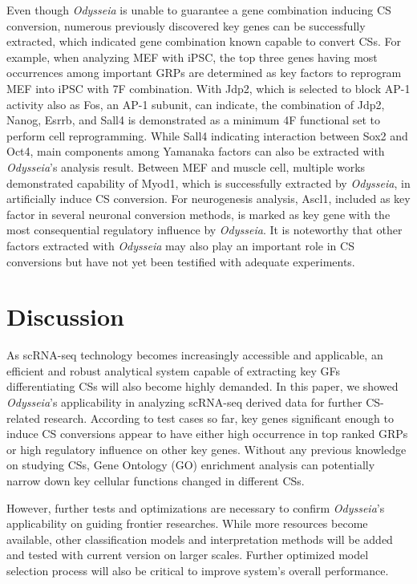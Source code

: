 \documentclass[fleqn,10pt]{wlscirep}
\begin{document}
Even though \emph{Odysseia} is unable to guarantee a gene combination inducing CS conversion, numerous previously discovered key genes can be successfully extracted, which indicated gene combination known capable to convert CSs.
For example, when analyzing MEF with iPSC, the top three genes having most occurrences among important GRPs are determined as key factors to reprogram MEF into iPSC with 7F combination\cite{ips7f}.
With Jdp2, which is selected to block AP-1 activity also as Fos, an AP-1 subunit, can indicate, the combination of Jdp2, Nanog, Esrrb, and Sall4 is demonstrated as a minimum 4F functional set to perform cell reprogramming\cite{ips7f}.
While Sall4 indicating interaction between Sox2 and Oct4\cite{sall4_oct4_sox2}, main components among Yamanaka factors\cite{yamanaka_2006, osk} can also be extracted with \emph{Odysseia}'s analysis result.
Between MEF and muscle cell, multiple works demonstrated capability of Myod1, which is successfully extracted by \emph{Odysseia}, in artificially induce CS conversion.\cite{myod_1990, myod_crispr}
For neurogenesis analysis, Ascl1, included as key factor in several neuronal conversion methods\cite{ascl1_repro,  ascl1_1frepro}, is marked as key gene with the most consequential regulatory influence by \emph{Odysseia}.
It is noteworthy that other factors extracted with \emph{Odysseia} may also play an important role in CS conversions but have not yet been  testified with adequate experiments.


\section*{Discussion}
\label{disc}
As scRNA-seq technology becomes increasingly accessible and applicable, an efficient and robust analytical system capable of extracting key GFs differentiating CSs will also become highly demanded.
In this paper, we showed \emph{Odysseia}'s applicability in analyzing scRNA-seq derived data for further CS-related research.
According to test cases so far, key genes significant enough to induce CS conversions appear to have either high occurrence in top ranked GRPs or high regulatory influence on other key genes.
Without any previous knowledge on studying CSs, Gene Ontology (GO) enrichment analysis can potentially narrow down key cellular functions changed in different CSs.

However, further tests and optimizations are necessary to confirm \emph{Odysseia}'s applicability on guiding frontier researches.
While more resources become available, other classification models and interpretation methods will be added and tested with current version on larger scales.
Further optimized model selection process will also be critical to improve system's overall performance.
\end{document}
